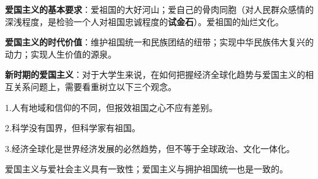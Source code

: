 \textbf{{{爱国主义的基本要求}}}{：爱祖国的大好河山；爱自己的骨肉同胞（对人民群众感情的深浅程度，是检验一个人对祖国忠诚程度的}\textbf{{{试金石}}}{）。爱祖国的灿烂文化。}

\textbf{{{爱国主义的时代价值}}}{：维护祖国统一和民族团结的纽带；实现中华民族伟大复兴的动力；实现人生价值的源泉。}

{\textbf{{{新时期的爱国主义}}}{：对于大学生来说，在如何把握经济全球化趋势与爱国主义的相互关系问题上，需要看重树立以下三个观念。}}

{1.人有地域和信仰的不同，但报效祖国之心不应有差别。}

{2.科学没有国界，但科学家有祖国。}

{3.经济全球化是世界经济发展的必然趋势，但不等于全球政治、文化一体化。}

{{爱国主义与爱社会主义具有一致性；爱国主义与拥护祖国统一也是一致的}。}
